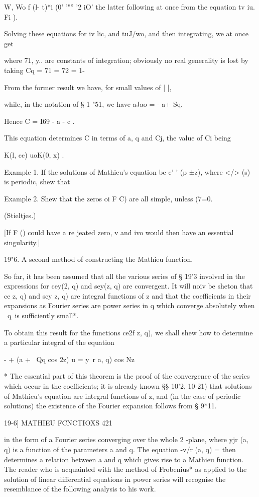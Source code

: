 W, Wo f (l- t)*i (0' '"'' '2 iO' the latter following at once from the
equation tv iu. Fi ).

Solving these equations for iv lic, and tuJ/wo, and then integrating,
we at once get

where 71, y.. are constants of integration; obviously no real
generality is lost by taking Cq = 71 = 72 = 1-

From the former result we have, for small values of | |,

while, in the notation of § 1 "51, we have aJao = - a+ Sq.

Hence C = I69 - a - c .

This equation determines C in terms of a, q and Cj, the value of Ci
being

K(l, cc) uoK(0, x) .

Example 1. If the solutions of Mathieu's equation be e' ' (p ±z),
where </> (s) is periodic, shew that

Example 2. Shew that the zeros oi F C) are all simple, unless (7=0.

(Stieltjes.)

[If F () could have a re jeated zero, v and ivo would then have an
essential singularity.]

19"6. A second method of constructing the Mathieu function.

So far, it has been assumed that all the various series of § 19'3
involved in the expressions for cey(2, q) and sey(z, q) are
convergent. It will noiv be sheton that ce z, q) and scy z, q) are
integral functions of z and that the coefficients in their expansions
as Fourier series are power series in q which converge absolutely when
\ q\ is sufficiently small*.

To obtain this result for the functions ce2f z, q), we shall shew how
to determine a particular integral of the equation

- + (a + \ Qq cos 2z) u = y\ r a, q) cos Nz

* The essential part of this theorem is the proof of the convergence
of the series which occur in the coefficients; it is already known §§
10'2, 10-21) that solutions of Mathieu's equation are integral
functions of z, and (in the case of periodic solutions) the existence
of the Fourier expansion follows from § 9*11.

19-6] MATHIEU FCNCTIOXS 421

in the form of a Fourier series converging over the whole 2 -plane,
where yjr (a, q) is a function of the parameters a and q. The equation
-v/r (a, q) = then determines a relation between a and q which gives
rise to a Mathieu function. The reader who is acquainted with the
method of Frobenius* as applied to the solution of linear differential
equations in power series will recognise the resemblance of the
following analysis to his work.

